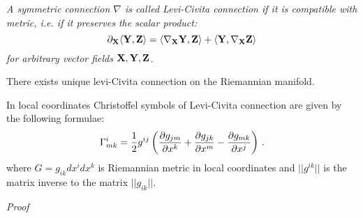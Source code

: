 \documentclass[12pt]{article}
\theoremstyle{theorem}
\numberwithin{equation}{section}
\begin{document}
{\it A symmetric connection $\nabla$ is called Levi-Civita connection if it is compatible with metric, i.e.
if it preserves the scalar product:
        \begin{equation}\label{connpreservingmetric}
  \partial_{\bf X}\langle{\bf Y},{\bf Z}\rangle=\langle\nabla_{\bf X}{\bf Y},{\bf Z}\rangle+\langle{\bf Y},\nabla_{\bf X}{\bf Z}\rangle
        \end{equation}
        for arbitrary vector fields ${\bf X},{\bf Y},{\bf Z}$.

  There exists unique levi-Civita connection on the Riemannian manifold.

  In local coordinates Christoffel symbols of Levi-Civita connection are given by the following formulae:
 \begin{equation}\label{levi-civitaformula}
    \Gamma^i_{mk}={1\over 2}g^{ij}\left({\partial g_{jm}\over\partial x^k}+
    {\partial g_{jk}\over\partial x^m}-{\partial g_{mk}\over \partial x^j}\right)\,.
 \end{equation}
 where $G=g_{ik}dx^idx^k$ is Riemannian metric in local coordinates and
 $||g^{ik}||$ is the matrix inverse to the matrix $||g_{ik}||$.

 }



 {\sl Proof}
\end{document}
